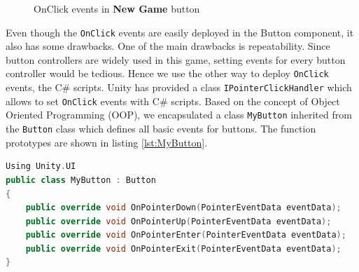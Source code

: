 \documentclass[msc,deptreport,ai]{infthesis}      %
\begin{document}
\begin{figure}[htbp]
\center
{}\hspace{-1pt}%
\hspace{-1pt}%
\caption{OnClick events in \textbf{New Game} button}
\label{fig:OnClick}
\end{figure}

Even though the \texttt{OnClick} events are easily deployed in the Button component, it also has some drawbacks. One of the main drawbacks is repeatability. Since button controllers are widely used in this game, setting events for every button controller would be tedious. Hence we use the other way to deploy \texttt{OnClick} events, the C\# scripts. Unity has provided a class \texttt{IPointerClickHandler} which allows to set \texttt{OnClick} events with C\# scripts. Based on the concept of Object Oriented Programming (OOP), we encapsulated a class \texttt{MyButton} inherited from the \texttt{Button} class which defines all basic events for buttons. The function prototypes are shown in listing \ref{lst:MyButton}.


\begin{lstlisting}[caption={MyButton class},label={lst:MyButton},language=C++]
Using Unity.UI
public class MyButton : Button
{
    public override void OnPointerDown(PointerEventData eventData);
    public override void OnPointerUp(PointerEventData eventData);
    public override void OnPointerEnter(PointerEventData eventData);
    public override void OnPointerExit(PointerEventData eventData);
}
\end{lstlisting}
\end{document}
